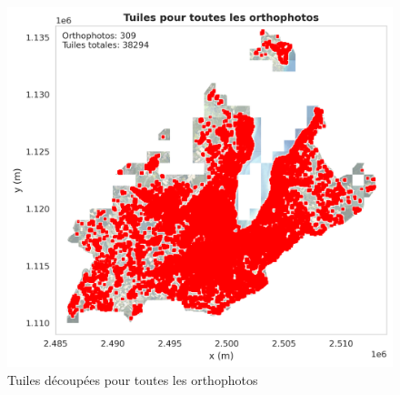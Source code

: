 \begin{figure}[H]
    \centering
    \includegraphics[width=1\linewidth]{02-main/figures/ch3/ch3_preparation_donnees_orthophotos_07_exemple_decoupe_orthophoto6.png}
    \caption{Tuiles découpées pour toutes les orthophotos}
    \label{fig:ch3_preparation_donnees_orthophotos_07_exemple_decoupe_orthophoto6}
\end{figure}

\newpage
